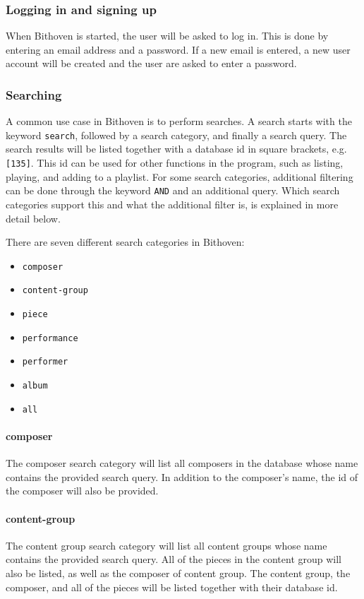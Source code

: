 \subsubsection{Logging in and signing up}
When Bithoven is started, the user will be asked to log in.
This is done by entering an email address and a password.
If a new email is entered, a new user account will be created and the user are asked to enter a password.

\subsubsection{Searching}
A common use case in Bithoven is to perform searches.
A search starts with the keyword \texttt{search}, followed by a search category, and finally a search query.
The search results will be listed together with a database id in square brackets, e.g. \texttt{[135]}.
This id can be used for other functions in the program, such as listing, playing, and adding to a playlist.
For some search categories, additional filtering can be done through the keyword \texttt{AND} and an additional query.
Which search categories support this and what the additional filter is, is explained in more detail below.

There are seven different search categories in Bithoven:
\begin{itemize}
    \item \texttt{composer}
    \item \texttt{content-group}
    \item \texttt{piece}
    \item \texttt{performance}
    \item \texttt{performer}
    \item \texttt{album}
    \item \texttt{all}
\end{itemize}

\paragraph{composer}
The composer search category will list all composers in the database whose name contains the provided search query.
In addition to the composer's name, the id of the composer will also be provided.

\paragraph{content-group}
The content group search category will list all content groups whose name contains the provided search query.
All of the pieces in the content group will also be listed, as well as the composer of content group.
The content group, the composer, and all of the pieces will be listed together with their database id.


